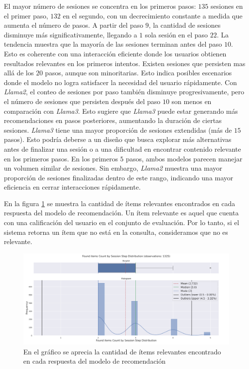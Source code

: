 \documentclass[11pt,a4paper,twoside]{thesis}
\begin{document}
El mayor número de sesiones se concentra en los primeros pasos: $135$ sesiones en el primer paso, $132$ en el segundo, con un decrecimiento constante a medida que aumenta el número de pasos. A partir del paso $9$, la cantidad de sesiones disminuye más significativamente, llegando a $1$ sola sesión en el paso $22$. La tendencia muestra que la mayoría de las sesiones terminan antes del paso $10$. Esto es coherente con una interacción eficiente donde los usuarios obtienen resultados relevantes en los primeros intentos.
Existen sesiones que persisten mas allá de los $20$ pasos, aunque son minoritarias. Esto indica posibles escenarios donde el modelo no logra satisfacer la necesidad del usuario rápidamente. Con \textit{Llama2}, el conteo de sesiones por paso también disminuye progresivamente, pero el número de sesiones que persisten después del paso $10$ son menos en comparación con \textit{Llama3}. Esto sugiere que \textit{Llama3} puede estar generando más recomendaciones en pasos posteriores, aumentando la duración de ciertas sesiones. \textit{Llama3} tiene una mayor proporción de sesiones extendidas (más de $15$ pasos). Esto podría deberse a un diseño que busca explorar más alternativas antes de finalizar una sesión o a una dificultad en encontrar contenido relevante en los primeros pasos. En los primeros $5$ pasos, ambos modelos parecen manejar un volumen similar de sesiones. Sin embargo, \textit{Llama2} muestra una mayor proporción de sesiones finalizadas dentro de este rango, indicando una mayor eficiencia en cerrar interacciones rápidamente.

\clearpage

En la figura \ref{fig:llama3-found_items_count_by_session_step_distribution} se muestra la cantidad de ítems relevantes encontrados en cada respuesta del modelo de recomendación. Un ítem relevante es aquel que cuenta con una calificación del usuario en el conjunto de evaluación. Por lo tanto, si el sistema retorna un ítem que no está en la consulta, consideramos que no es relevante.


\begin{figure}[H]
	\centering
	\includegraphics[width=15cm]{./images/llama3/found_items_count_by_session_step_distribution.png}
	\caption{En el gráfico se aprecia la cantidad de ítems relevantes encontrado en cada respuesta del modelo de recomendación}
	\label{fig:llama3-found_items_count_by_session_step_distribution}
\end{figure}
\end{document}
